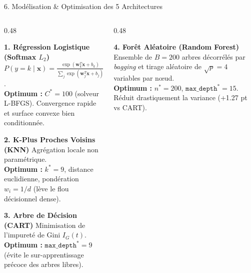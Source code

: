 \documentclass[aspectratio=169,10pt]{beamer}
\begin{document}
\begin{frame}{6. Modélisation \& Optimisation des 5 Architectures}
    \begin{columns}[T]
        \begin{column}{0.48\textwidth}
            \begin{block}{\textbf{1. Régression Logistique (Softmax $L_2$)}}
                \scriptsize
                $P(y = k \mid \mathbf{x}) = \frac{\exp(\mathbf{w}_k^T \mathbf{x} + b_k)}{\sum_j \exp(\mathbf{w}_j^T \mathbf{x} + b_j)}$.\\
                \textbf{Optimum :} $C^* = 100$ (solveur L-BFGS). Convergence rapide et surface convexe bien conditionnée.
            \end{block}
            \vspace{0.1cm}
            \begin{block}{\textbf{2. K-Plus Proches Voisins (KNN)}}
                \scriptsize
                Agrégation locale non paramétrique.\\
                \textbf{Optimum :} $k^* = 9$, distance euclidienne, pondération $w_i = 1/d$ (lève le flou décisionnel dense).
            \end{block}
            \vspace{0.1cm}
            \begin{block}{\textbf{3. Arbre de Décision (CART)}}
                \scriptsize
                Minimisation de l'impureté de Gini $I_G(t)$.\\
                \textbf{Optimum :} $\texttt{max\_depth}^* = 9$ (évite le sur-apprentissage précoce des arbres libres).
            \end{block}
        \end{column}
        \begin{column}{0.48\textwidth}
            \begin{block}{\textbf{4. Forêt Aléatoire (Random Forest)}}
                \scriptsize
                Ensemble de $B = 200$ arbres décorrélés par \textit{bagging} et tirage aléatoire de $\sqrt{p} = 4$ variables par nœud.\\
                \textbf{Optimum :} $n^* = 200$, $\texttt{max\_depth}^* = 15$.\\
                Réduit drastiquement la variance (+1.27 pt vs CART).
            \end{block}

\end{column}
\end{columns}
\end{frame}
\end{document}
